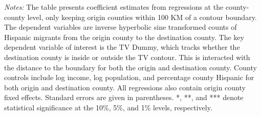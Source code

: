\begin{table}[!h]
{\begin{threeparttable}
			\begin{tablenotes}[flushleft]
				\item \textit{Notes:} The table presents coefficient estimates from regressions at the county-county level, only keeping origin counties within 100 KM of a contour boundary. The dependent variables are inverse hyperbolic sine transformed counts of Hispanic migrants from the origin county to the destination county. The key dependent variable of interest is the TV Dummy, which tracks whether the destination county is inside or outside the TV contour. This is interacted with the distance to the boundary for both the origin and destination county. County controls include log income, log population, and percentage county Hispanic for both origin and destination county. All regressions also contain origin county fixed effects. Standard errors are given in parentheses. *, **, and *** denote statistical significance at the 10\%, 5\%, and 1\% levels, respectively.
			\end{tablenotes}
		\end{threeparttable}
	}
\end{table}